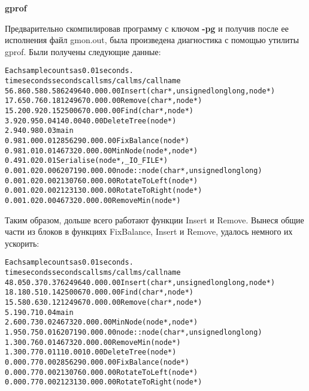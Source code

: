 \documentclass[12pt]{article}
\begin{document}
    \begin{center}
    	\textbf{gprof}
    \end{center}
    
    Предварительно скомпилировав программу с ключом \textbf{-pg} и получив после ее исполнения файл gmon.out, была произведена диагностика с помощью утилиты gprof. Были получены следующие данные:
    
    \begin{alltt}
Each sample counts as 0.01 seconds.
  %   cumulative   self              self     total           
time   seconds   seconds    calls  ms/call  ms/call  name    
56.86     0.58     0.58   624964     0.00     0.00  Insert(char*, unsigned long long, node*)
17.65     0.76     0.18   124967     0.00     0.00  Remove(char*, node*)
15.20     0.92     0.15   250067     0.00     0.00  Find(char*, node*)
3.92      0.95     0.04        1    40.00    40.00  DeleteTree(node*)
2.94      0.98     0.03                             main
0.98      1.00     0.01   285629     0.00     0.00  FixBalance(node*)
0.98      1.01     0.01    46732     0.00     0.00  MinNode(node*, node*)
0.49      1.02     0.01                             Serialise(node*, _IO_FILE*)
0.00      1.02     0.00   620719     0.00     0.00  node::node(char*, unsigned long long)
0.00      1.02     0.00   213076     0.00     0.00  RotateToLeft(node*)
0.00      1.02     0.00   212313     0.00     0.00  RotateToRight(node*)
0.00      1.02     0.00    46732     0.00     0.00  RemoveMin(node*)
    \end{alltt}
    Таким образом, дольше всего работают функции Insert и Remove. Вынеся общие части из блоков в функциях FixBalance, Insert и Remove, удалось немного их ускорить:
    
    \begin{alltt}
Each sample counts as 0.01 seconds.
  %   cumulative   self              self     total           
time   seconds   seconds    calls  ms/call  ms/call  name    
48.05     0.37     0.37   624964     0.00     0.00  Insert(char*, unsigned long long, node*)
18.18     0.51     0.14   250067     0.00     0.00  Find(char*, node*)
15.58     0.63     0.12   124967     0.00     0.00  Remove(char*, node*)
5.19      0.71     0.04                             main
2.60      0.73     0.02    46732     0.00     0.00  MinNode(node*, node*)
1.95      0.75     0.01   620719     0.00     0.00  node::node(char*, unsigned long long)
1.30      0.76     0.01    46732     0.00     0.00  RemoveMin(node*)
1.30      0.77     0.01        1    10.00    10.00  DeleteTree(node*)
0.00      0.77     0.00   285629     0.00     0.00  FixBalance(node*)
0.00      0.77     0.00   213076     0.00     0.00  RotateToLeft(node*)
0.00      0.77     0.00   212313     0.00     0.00  RotateToRight(node*)
    \end{alltt}
\end{document}
